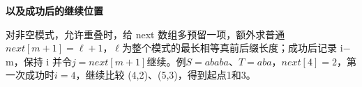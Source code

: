 {\color{ink}\bfseries 以及成功后的继续位置}\par\vspace{1bp}对非空模式，允许重叠时，给 next 数组多预留一项，额外求普通\(next[m+\allowbreak{}1]=\allowbreak{}\ell +\allowbreak{}1\)，\(\ell \)为整个模式的最长相等真前后缀长度；成功后记录 i\(-\)m，保持 i 并令\(j=\allowbreak{}next[m+\allowbreak{}1]\)继续。例\(S=\allowbreak{}ababa\)、\(T=\allowbreak{}aba\)，\(next[4]=\allowbreak{}2\)，第一次成功时\(i=\allowbreak{}4\)，继续比较 (4,\allowbreak{}2)、(5,\allowbreak{}3)，得到起点1和3。
